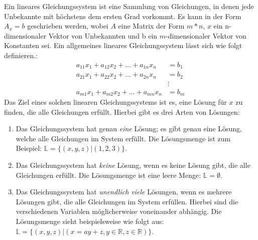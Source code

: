 \documentclass[a4paper, 12pt]{report}
\begin{document}
Ein lineares Gleichungssystem ist eine Sammlung von Gleichungen, in denen jede Unbekannte mit höchstens
dem ersten Grad vorkommt.
Es kann in der Form $ A_x = b $ geschrieben werden, wobei $A$ eine Matrix der Form $ m * n$,
$x$ ein n-dimensionaler Vektor von Unbekannten
und b ein $m$-dimensionaler Vektor von Konstanten sei.
Ein allgemeines lineares Gleichungssystem lässt sich wie folgt definieren.: \cite{1}
\begin{align}
    \label{eq:linGle}
    a_{11}x_{1}+ a_{12}x_{2}+\hdots+ a_{1n}x_{n} &= b_1   \nonumber \\
    a_{21}x_{1}+ a_{22}x_{2}+\hdots+ a_{2n}x_{n} &= b_2 \nonumber\\
                                                 &\vdots   \nonumber \\
    a_{m1}x_{1}+ a_{m2}x_2+\hdots+a_{mn}x_{n} &= b_{m}
\end{align}
Das Ziel eines solchen linearen Gleichungssystems ist es, eine Lösung für $x$ zu finden, die alle Gleichungen erfüllt.
Hierbei gibt es drei Arten von Lösungen:
\begin{enumerate}
    \item Das Gleichungssystem hat genau \textit{eine} Lösung;
        es gibt genau eine Lösung, welche alle Gleichungen im System
        erfüllt. Die Lösungsmenge ist zum Beispiel: $\mathbb{L} = \{ (x,y,z)| (1,2,3)\} $.
    \item Das Gleichungssystem hat \textit{keine} Lösung, wenn es keine Lösung gibt,
        die alle Gleichungen erfüllt. Die Lösungsmenge ist eine leere Menge: $ \mathbb{L}= \emptyset$.
    \item Das Gleichungssystem hat \textit{unendlich viele} Lösungen, wenn es mehrere Lösungen gibt,
        die alle Gleichungen im System erfüllen.
        Hierbei sind die verschiedenen Variablen möglicherweise voneinander abhängig.
        Die Lösungsmenge sieht beispielsweise wie folgt aus:
        \newline $ \mathbb{L} = \{(x, y, z)| (x = ay + z, y\in \mathbb{R}, z \in \mathbb{R}) \} $.
\end{enumerate}
\end{document}
